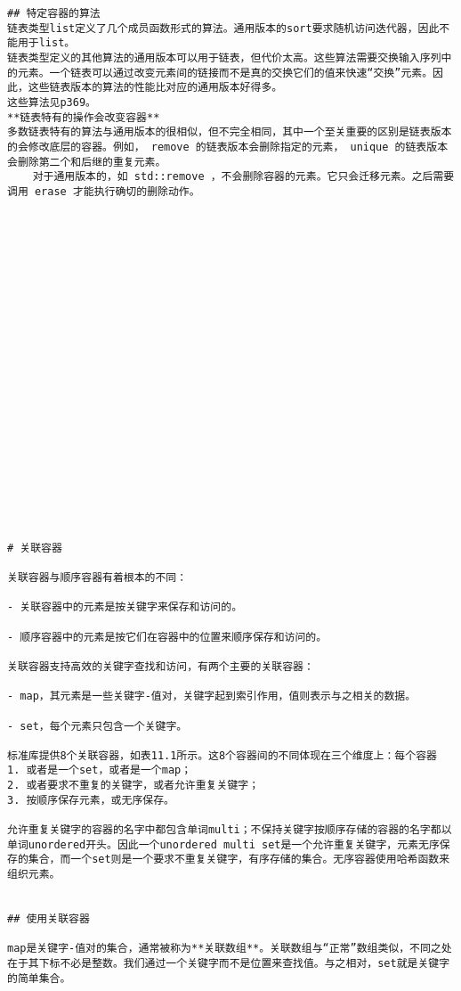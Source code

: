 \documentclass[
  a4paper,
  oneside,tablecaptionabove
]{scrbook}
\begin{document}
\begin{lstlisting}
## 特定容器的算法  
链表类型list定义了几个成员函数形式的算法。通用版本的sort要求随机访问迭代器，因此不能用于list。  
链表类型定义的其他算法的通用版本可以用于链表，但代价太高。这些算法需要交换输入序列中的元素。一个链表可以通过改变元素间的链接而不是真的交换它们的值来快速“交换”元素。因此，这些链表版本的算法的性能比对应的通用版本好得多。  
这些算法见p369。  
**链表特有的操作会改变容器**  
多数链表特有的算法与通用版本的很相似，但不完全相同，其中一个至关重要的区别是链表版本的会修改底层的容器。例如， remove 的链表版本会删除指定的元素， unique 的链表版本会删除第二个和后继的重复元素。  
    对于通用版本的，如 std::remove ，不会删除容器的元素。它只会迁移元素。之后需要调用 erase 才能执行确切的删除动作。  























# 关联容器

关联容器与顺序容器有着根本的不同：

- 关联容器中的元素是按关键字来保存和访问的。

- 顺序容器中的元素是按它们在容器中的位置来顺序保存和访问的。

关联容器支持高效的关键字查找和访问，有两个主要的关联容器：

- map，其元素是一些关键字-值对，关键字起到索引作用，值则表示与之相关的数据。

- set，每个元素只包含一个关键字。

标准库提供8个关联容器，如表11.1所示。这8个容器间的不同体现在三个维度上：每个容器  
1. 或者是一个set，或者是一个map；
2. 或者要求不重复的关键字，或者允许重复关键字；
3. 按顺序保存元素，或无序保存。

允许重复关键字的容器的名字中都包含单词multi；不保持关键字按顺序存储的容器的名字都以单词unordered开头。因此一个unordered multi set是一个允许重复关键字，元素无序保存的集合，而一个set则是一个要求不重复关键字，有序存储的集合。无序容器使用哈希函数来组织元素。


## 使用关联容器

map是关键字-值对的集合，通常被称为**关联数组**。关联数组与“正常”数组类似，不同之处在于其下标不必是整数。我们通过一个关键字而不是位置来查找值。与之相对，set就是关键字的简单集合。
\end{lstlisting}
\end{document}
